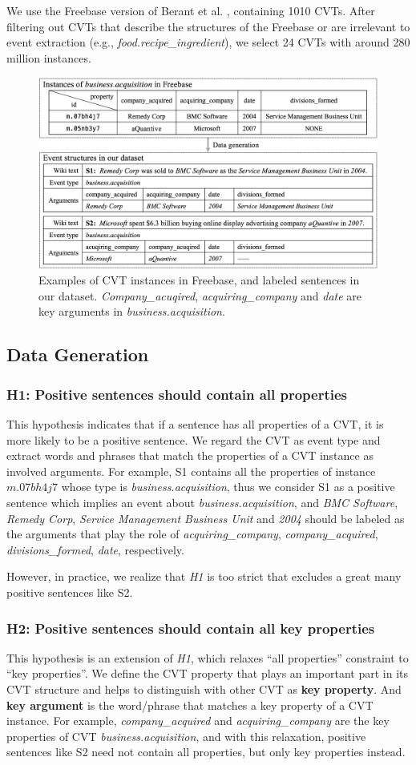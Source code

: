 We use the Freebase version of Berant et al. , containing 1010 CVTs. After filtering out CVTs that describe the structures of the Freebase or are irrelevant to event extraction (e.g., \emph{food.recipe\_ingredient}), we select 24 CVTs with around 280 million instances.

\begin{figure}[h]
	\centering
	\includegraphics[width=.48\textwidth]{temp}
	\caption{Examples of CVT instances in Freebase, and labeled sentences in our dataset. \emph{Company\_acuqired}, \emph{acquiring\_company} and \emph{date} are key arguments in \emph{business.acquisition}. \label{fig:3}}
\end{figure}

\subsection{Data Generation\label{datagen}}
\subsubsection{H1: Positive sentences should contain all properties}
This hypothesis indicates that if a sentence has all properties of a CVT, it is more likely to be a positive sentence. We regard the CVT as event type and extract words and phrases that match the properties of a CVT instance as involved arguments. For example, S1 contains all the properties of instance $m.07bh4j7$ whose type is \emph{business.acquisition}, thus we consider S1 as a positive sentence which implies an event about \emph{business.acquisition}, and \emph{BMC Software}, \emph{Remedy Corp}, \emph{Service Management Business Unit} and \emph{2004} should be labeled as the arguments that play the role of \emph{acquiring\_company}, \emph{company\_acquired}, \emph{divisions\_formed}, \emph{date}, respectively.

However, in practice, we realize that \emph{H1} is too strict that excludes a great many positive sentences like S2. 

\subsubsection{H2: Positive sentences should contain all key properties}
This hypothesis is an extension of \emph{H1}, which relaxes ``all properties'' constraint to ``key properties''. We define the CVT property that plays an important part in its CVT structure and helps to distinguish with other CVT as \textbf{key property}. And \textbf{key argument} is the word/phrase that matches a key property of a CVT instance. For example, \emph{company\_acquired} and \emph{acquiring\_company} are the key properties of CVT \emph{business.acquisition}, and with this relaxation, positive sentences like S2 need not contain all properties, but only key properties instead.

